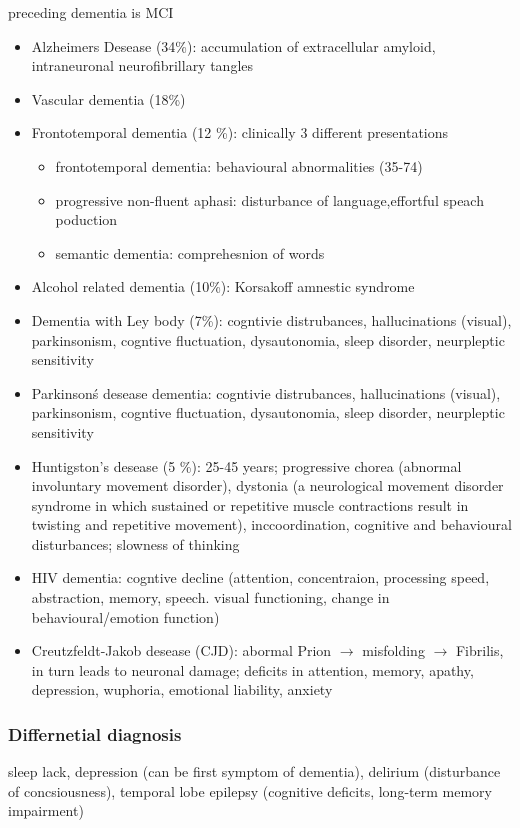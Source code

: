 \documentclass[fleqn]{article}\usepackage{caption}
\begin{document}
preceding dementia is MCI
\begin{itemize}
\item Alzheimers Desease (34\%): accumulation of extracellular amyloid, intraneuronal neurofibrillary tangles
\item Vascular dementia (18\%)
\item Frontotemporal dementia (12 \%): clinically 3 different presentations 
\begin{itemize}
\item frontotemporal dementia: behavioural abnormalities (35-74)
\item progressive non-fluent aphasi: disturbance of language,effortful speach poduction
\item semantic dementia: comprehesnion of words
\end{itemize}
\item Alcohol related dementia (10\%): Korsakoff amnestic syndrome
\item Dementia with Ley body (7\%): cogntivie distrubances, hallucinations (visual), parkinsonism, cogntive fluctuation, dysautonomia, sleep disorder, neurpleptic sensitivity
\item Parkinson\'s desease dementia: cogntivie distrubances, hallucinations (visual), parkinsonism, cogntive fluctuation, dysautonomia, sleep disorder, neurpleptic sensitivity
\item Huntigston's desease (5 \%):  25-45 years; progressive chorea (abnormal involuntary movement disorder), dystonia (a neurological movement disorder syndrome in which sustained or repetitive muscle contractions result in twisting and repetitive movement), inccoordination, cognitive and behavioural disturbances; slowness of thinking
\item HIV dementia: cogntive decline (attention, concentraion, processing speed, abstraction, memory, speech. visual functioning, change in behavioural/emotion function)
\item Creutzfeldt-Jakob desease (CJD): abormal Prion $\rightarrow$ misfolding $\rightarrow$ Fibrilis, in turn leads to neuronal damage; deficits in attention, memory, apathy, depression, wuphoria, emotional liability, anxiety
\end{itemize}

\subsubsection{Differnetial diagnosis}
sleep lack, depression (can be first symptom of dementia), delirium (disturbance of concsiousness), temporal lobe epilepsy (cognitive deficits, long-term memory impairment)
\end{document}
